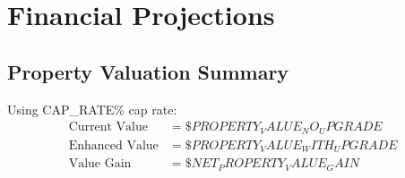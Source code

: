 \documentclass[11pt,letterpaper]{article}
\begin{document}
\section{Financial Projections}

\subsection{Property Valuation Summary}
Using {{CAP_RATE}}\% cap rate:
\begin{align}
\text{Current Value} &= \${{PROPERTY_VALUE_NO_UPGRADE}} \\
\text{Enhanced Value} &= \${{PROPERTY_VALUE_WITH_UPGRADE}} \\
\text{Value Gain} &= \${{NET_PROPERTY_VALUE_GAIN}}
\end{align}
\end{document}
